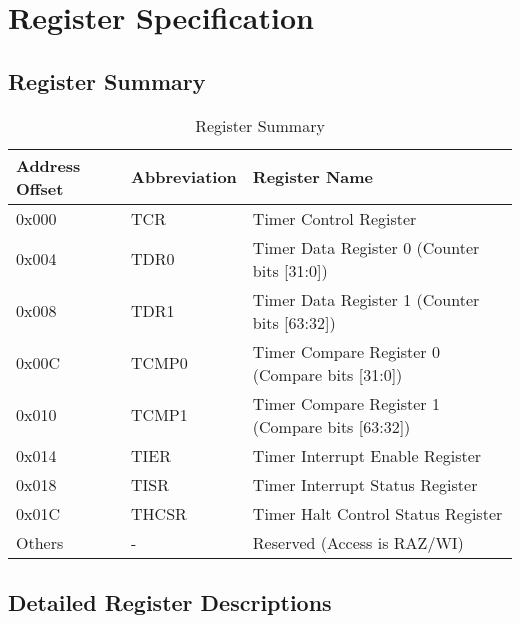 \documentclass[11pt, a4paper]{article}
\begin{document}
\section{Register Specification}

\subsection{Register Summary}
\begin{table}[H]
    \centering
    \caption{Register Summary}
    \label{tab:reg_summary}
    \begin{tabular}{@{}lll@{}}
        \toprule
        \textbf{Address Offset} & \textbf{Abbreviation} & \textbf{Register Name} \\ \midrule
        0x000 & TCR & Timer Control Register \\
        0x004 & TDR0 & Timer Data Register 0 (Counter bits [31:0]) \\
        0x008 & TDR1 & Timer Data Register 1 (Counter bits [63:32]) \\
        0x00C & TCMP0 & Timer Compare Register 0 (Compare bits [31:0]) \\
        0x010 & TCMP1 & Timer Compare Register 1 (Compare bits [63:32]) \\
        0x014 & TIER & Timer Interrupt Enable Register \\
        0x018 & TISR & Timer Interrupt Status Register \\
        0x01C & THCSR & Timer Halt Control Status Register \\
        Others & - & Reserved (Access is RAZ/WI) \\ \bottomrule
    \end{tabular}
\end{table}

\subsection{Detailed Register Descriptions}
\end{document}
